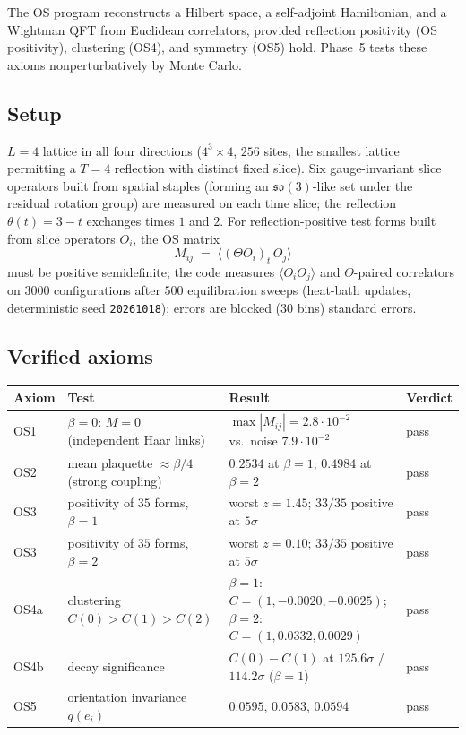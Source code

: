 \documentclass[11pt,a4paper]{article}
\begin{document}
The OS program \cite{osterwalder1973, osterwalder1978} reconstructs a
Hilbert space, a self-adjoint Hamiltonian, and a Wightman QFT from Euclidean
correlators, provided reflection positivity (OS positivity), clustering
(OS4), and symmetry (OS5) hold.  Phase~5 tests these axioms
nonperturbatively by Monte Carlo.

\subsection{Setup}
\label{sec:ossetup}

$L = 4$ lattice in all four directions ($4^3 \times 4$, $256$ sites, the
smallest lattice permitting a $T = 4$ reflection with distinct fixed
slice).  Six gauge-invariant slice operators built from spatial staples
(forming an $\mathfrak{so}(3)$-like set under the residual rotation group)
are measured on each time slice; the reflection $\theta(t) = 3 - t$ exchanges
times $1$ and $2$.  For reflection-positive test forms built from slice
operators $O_i$, the OS matrix
\begin{equation}
  M_{ij} \;=\; \bigl\langle (\Theta O_i)_t \, O_j\bigr\rangle
  \label{eq:osmatrix}
\end{equation}
must be positive semidefinite; the code measures $\langle O_i O_j\rangle$
and $\Theta$-paired correlators on $3000$ configurations after $500$
equilibration sweeps (heat-bath updates, deterministic seed
\texttt{20261018}); errors are blocked (30 bins) standard errors.

\subsection{Verified axioms}
\label{sec:osresults}

\begin{center}
\small
\begin{tabular}{@{}llll@{}}
\toprule
Axiom & Test & Result & Verdict \\
\midrule
OS1 & $\beta = 0$: $M = 0$ (independent Haar links) &
 $\max|M_{ij}| = 2.8\cdot 10^{-2}$ vs.\ noise $7.9\cdot 10^{-2}$ & pass \\
OS2 & mean plaquette $\approx \beta/4$ (strong coupling) &
 $0.2534$ at $\beta = 1$; $0.4984$ at $\beta = 2$ & pass \\
OS3 & positivity of $35$ forms, $\beta = 1$ &
 worst $z = 1.45$; $33/35$ positive at $5\sigma$ & pass \\
OS3 & positivity of $35$ forms, $\beta = 2$ &
 worst $z = 0.10$; $33/35$ positive at $5\sigma$ & pass \\
OS4a & clustering $C(0) > C(1) > C(2)$ &
 $\beta = 1$: $C = (1, -0.0020, -0.0025)$; $\beta = 2$: $C = (1, 0.0332,
 0.0029)$ & pass \\
OS4b & decay significance &
 $C(0) - C(1)$ at $125.6\sigma$ / $114.2\sigma$ ($\beta = 1$) & pass \\
OS5 & orientation invariance $q(e_i)$ &
 $0.0595,\, 0.0583,\, 0.0594$ & pass \\
\bottomrule
\end{tabular}
\end{center}
\end{document}

